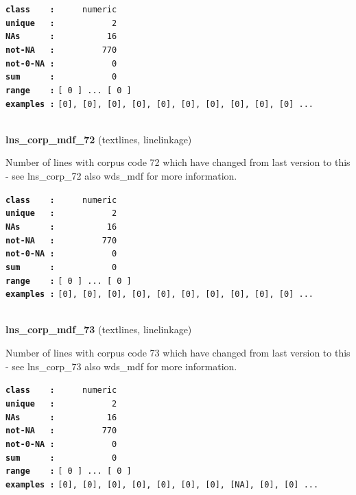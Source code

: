 \documentclass[]{article}
\begin{document}
\textbf{\texttt{class\ \ \ \ :}} \texttt{~~~~~numeric}\\
\textbf{\texttt{unique\ \ \ :}} \texttt{~~~~~~~~~~~2}\\
\textbf{\texttt{NAs\ \ \ \ \ \ :}} \texttt{~~~~~~~~~~16}\\
\textbf{\texttt{not-NA\ \ \ :}} \texttt{~~~~~~~~~770}\\
\textbf{\texttt{not-0-NA\ :}} \texttt{~~~~~~~~~~~0}\\
\textbf{\texttt{sum\ \ \ \ \ \ :}} \texttt{~~~~~~~~~~~0}\\
\textbf{\texttt{range\ \ \ \ :}}
\texttt{{[}\ 0\ {]}\ ...\ {[}\ 0\ {]}}\\
\textbf{\texttt{examples\ :}}
\texttt{{[}0{]},\ {[}0{]},\ {[}0{]},\ {[}0{]},\ {[}0{]},\ {[}0{]},\ {[}0{]},\ {[}0{]},\ {[}0{]},\ {[}0{]}\ ...}\\

~

\textbf{lns\_corp\_mdf\_72} (textlines, linelinkage)

Number of lines with corpus code 72 which have changed from last version
to this - see lns\_corp\_72 also wds\_mdf for more information.

\textbf{\texttt{class\ \ \ \ :}} \texttt{~~~~~numeric}\\
\textbf{\texttt{unique\ \ \ :}} \texttt{~~~~~~~~~~~2}\\
\textbf{\texttt{NAs\ \ \ \ \ \ :}} \texttt{~~~~~~~~~~16}\\
\textbf{\texttt{not-NA\ \ \ :}} \texttt{~~~~~~~~~770}\\
\textbf{\texttt{not-0-NA\ :}} \texttt{~~~~~~~~~~~0}\\
\textbf{\texttt{sum\ \ \ \ \ \ :}} \texttt{~~~~~~~~~~~0}\\
\textbf{\texttt{range\ \ \ \ :}}
\texttt{{[}\ 0\ {]}\ ...\ {[}\ 0\ {]}}\\
\textbf{\texttt{examples\ :}}
\texttt{{[}0{]},\ {[}0{]},\ {[}0{]},\ {[}0{]},\ {[}0{]},\ {[}0{]},\ {[}0{]},\ {[}0{]},\ {[}0{]},\ {[}0{]}\ ...}\\

~

\textbf{lns\_corp\_mdf\_73} (textlines, linelinkage)

Number of lines with corpus code 73 which have changed from last version
to this - see lns\_corp\_73 also wds\_mdf for more information.

\textbf{\texttt{class\ \ \ \ :}} \texttt{~~~~~numeric}\\
\textbf{\texttt{unique\ \ \ :}} \texttt{~~~~~~~~~~~2}\\
\textbf{\texttt{NAs\ \ \ \ \ \ :}} \texttt{~~~~~~~~~~16}\\
\textbf{\texttt{not-NA\ \ \ :}} \texttt{~~~~~~~~~770}\\
\textbf{\texttt{not-0-NA\ :}} \texttt{~~~~~~~~~~~0}\\
\textbf{\texttt{sum\ \ \ \ \ \ :}} \texttt{~~~~~~~~~~~0}\\
\textbf{\texttt{range\ \ \ \ :}}
\texttt{{[}\ 0\ {]}\ ...\ {[}\ 0\ {]}}\\
\textbf{\texttt{examples\ :}}
\texttt{{[}0{]},\ {[}0{]},\ {[}0{]},\ {[}0{]},\ {[}0{]},\ {[}0{]},\ {[}0{]},\ {[}NA{]},\ {[}0{]},\ {[}0{]}\ ...}\\
\end{document}
